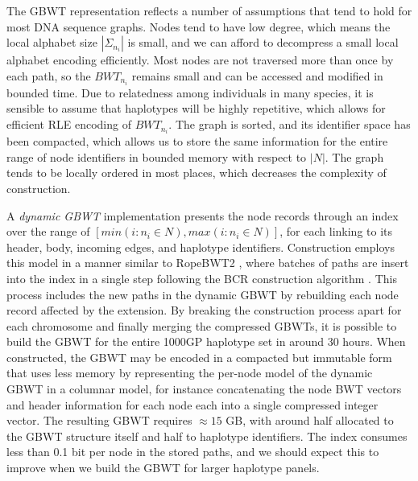 The GBWT representation reflects a number of assumptions that tend to hold for most DNA sequence graphs.
Nodes tend to have low degree, which means the local alphabet size $|\Sigma_{n_i}|$ is small, and we can afford to decompress a small local alphabet encoding efficiently.
Most nodes are not traversed more than once by each path, so the $BWT_{n_i}$ remains small and can be accessed and modified in bounded time.
Due to relatedness among individuals in many species, it is sensible to assume that haplotypes will be highly repetitive, which allows for efficient RLE encoding of $BWT_{n_i}$.
The graph is sorted, and its identifier space has been compacted, which allows us to store the same information for the entire range of node identifiers in bounded memory with respect to $|N|$.
The graph tends to be locally ordered in most places, which decreases the complexity of construction.

A \emph{dynamic GBWT} implementation presents the node records through an index over the range of $[min(i : n_i \in N), max(i : n_i \in N)]$, for each linking to its header, body, incoming edges, and haplotype identifiers.
Construction employs this model in a manner similar to RopeBWT2 \cite{li2014fast}, where batches of paths are insert into the index in a single step following the BCR construction algorithm \cite{bauer2013lightweight}.
This process includes the new paths in the dynamic GBWT by rebuilding each node record affected by the extension.
By breaking the construction process apart for each chromosome and finally merging the compressed GBWTs, it is possible to build the GBWT for the entire 1000GP haplotype set in around 30 hours.
When constructed, the GBWT may be encoded in a compacted but immutable form that uses less memory by representing the per-node model of the dynamic GBWT in a columnar model, for instance concatenating the node BWT vectors and header information for each node each into a single compressed integer vector.
The resulting GBWT requires $\approx 15$ GB, with around half allocated to the GBWT structure itself and half to haplotype identifiers.
The index consumes less than 0.1 bit per node in the stored paths, and we should expect this to improve when we build the GBWT for larger haplotype panels.

